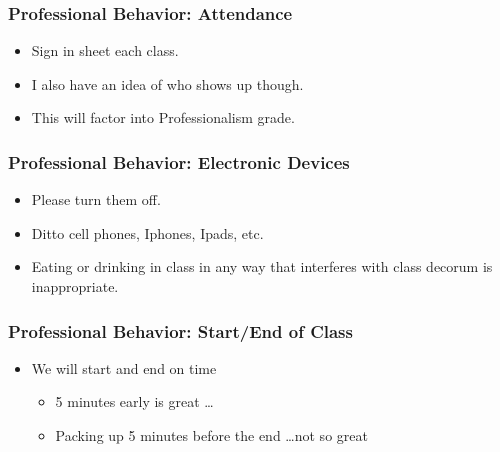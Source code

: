 \documentclass[9pt]{beamer}
\begin{document}

\begin{frame}[t]
\frametitle{Professional Behavior: Attendance}
\begin{itemize}
\item Sign in sheet each class.
\bigskip
\item I also have an idea of who shows up though.
\bigskip
\item This will factor into Professionalism grade.
\end{itemize}
\end{frame}


\begin{frame}[t]
\frametitle{Professional Behavior: Electronic Devices}
\begin{itemize}
\item Please turn them off.
\bigskip
\item Ditto cell phones, Iphones, Ipads, etc.
\bigskip
\item Eating or drinking in class in any way that interferes with class decorum is inappropriate.
\end{itemize}
\end{frame}


\begin{frame}[t]
\frametitle{Professional Behavior: Start/End of Class}
\begin{itemize}
\item We will start and end on time
\begin{itemize}
\medskip
\item 5 minutes early is great \ldots
\medskip
\item Packing up 5 minutes before the end \ldots not so great
\end{itemize}
\end{itemize}
\end{frame}
\end{document}

